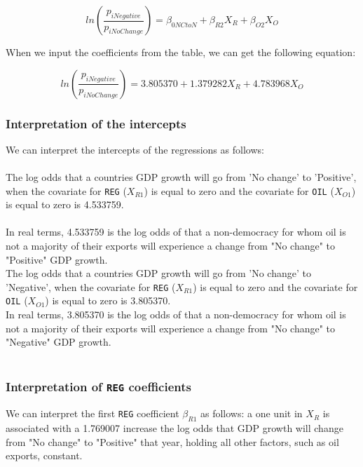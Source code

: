 \documentclass[12pt,letterpaper]{article}
\begin{document}
\begin{equation}
ln(\frac{p_{iNegative}}{p_{iNoChange}}) = \beta_{0NCtoN} + \beta_{R2}X_{R} + \beta_{O2}X_{O}
\end{equation}

\noindent When we input the coefficients from the table, we can get the following equation:

\begin{equation}
ln(\frac{p_{iNegative}}{p_{iNoChange}}) = 3.805370 + 1.379282X_{R} + 4.783968X_{O}
\end{equation}

\pagebreak
\subsubsection {Interpretation of the intercepts}

\noindent We can interpret the intercepts of the regressions as follows:
\\\\
\noindent The log odds that a countries GDP growth will go from 'No change' to 'Positive', when the covariate for \texttt{REG} ($X_{R1}$) is equal to zero  and the covariate for \texttt{OIL} ($X_{O1}$) is equal to zero is 4.533759.
\\\\
\noindent In real terms, 4.533759 is the log odds of that a non-democracy for whom oil is not a majority of their exports will experience a change from "No change" to "Positive" GDP growth. 
\\

\noindent The log odds that a countries GDP growth will go from 'No change' to 'Negative', when the covariate for \texttt{REG} ($X_{R1}$) is equal to zero  and the covariate for \texttt{OIL} ($X_{O1}$) is equal to zero is 3.805370.
\\

\noindent In real terms, 3.805370 is the log odds of that a non-democracy for whom oil is not a majority of their exports will experience a change from "No change" to "Negative" GDP growth.
\\\\


\subsubsection{Interpretation of \texttt{REG} coefficients}


\noindent We can interpret the first \texttt{REG} coefficient $\beta_{R1}$ as follows: a one unit in $X_{R}$ is associated with a 1.769007 increase the log odds that GDP growth will change from "No change" to "Positive" that year, holding all other factors, such as oil exports, constant.
\\
\end{document}
